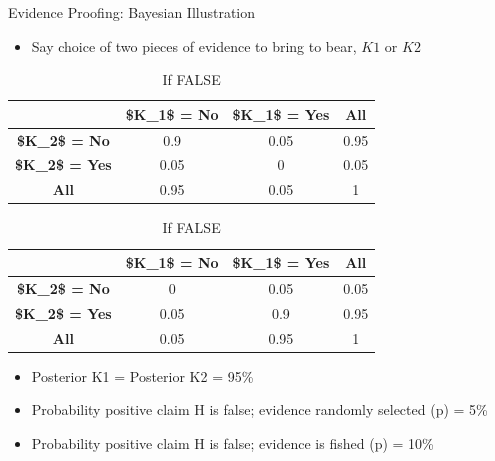 \documentclass[
  11pt,
  ignorenonframetext,
]{beamer}
\providecommand{\tightlist}{%
  \setlength{\itemsep}{0pt}\setlength{\parskip}{0pt}}\usepackage{longtable,booktabs,array}
\begin{document}
\begin{frame}{Evidence Proofing: Bayesian Illustration}
\protect\hypertarget{evidence-proofing-bayesian-illustration}{}
\begin{itemize}
\tightlist
\item
  Say choice of two pieces of evidence to bring to bear, \(K1\) or
  \(K2\)
\end{itemize}

\begin{table}

\caption{Likelihoods}\begin{minipage}[t]{0.50\linewidth}
\subcaption{\label{tbl-anonymous-96063-1}}

{\centering 

\caption{If TRUE }\tabularnewline

\centering
\begin{tabular}{>{}c|c|c|c}
\hline
 & \$K\_1\$ = No & \$K\_1\$ = Yes & All\\
\hline
\textbf{\$K\_2\$ = No} & 0.9 & 0.05 & 0.95\\
\hline
\textbf{\$K\_2\$ = Yes} & 0.05 & 0 & 0.05\\
\hline
\textbf{All} & 0.95 & 0.05 & 1\\
\hline
\end{tabular}

}

\end{minipage}%
%
\begin{minipage}[t]{0.50\linewidth}
\subcaption{\label{tbl-anonymous-96063-2}}

{\centering 

\caption{If FALSE }\tabularnewline

\centering
\begin{tabular}{>{}c|c|c|c}
\hline
 & \$K\_1\$ = No & \$K\_1\$ = Yes & All\\
\hline
\textbf{\$K\_2\$ = No} & 0 & 0.05 & 0.05\\
\hline
\textbf{\$K\_2\$ = Yes} & 0.05 & 0.9 & 0.95\\
\hline
\textbf{All} & 0.05 & 0.95 & 1\\
\hline
\end{tabular}

}

\end{minipage}%

\end{table}

\begin{itemize}
\tightlist
\item
  Posterior \textbar{} K1 = Posterior \textbar{} K2 = 95\%
\item
  Probability positive claim \textbar{} H is false; evidence randomly
  selected (p) = 5\%
\item
  Probability positive claim \textbar{} H is false; evidence is fished
  (p) = 10\%
\end{itemize}
\end{frame}
\end{document}
